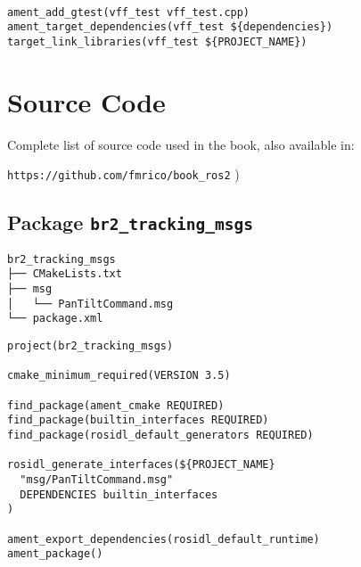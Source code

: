  \footnotesize
\begin{tcolorbox}[sharp corners, colframe=gray!80, colback=LightGray, left=0pt, top=0pt, bottom=0pt, title=\texttt{br2\_vff\_avoidance/tests/CMakeLists.txt}]
  \begin{verbatim}

ament_add_gtest(vff_test vff_test.cpp)
ament_target_dependencies(vff_test ${dependencies})
target_link_libraries(vff_test ${PROJECT_NAME})
    \end{verbatim}
    \end{tcolorbox}
  \normalsize



\appendix

\chapter[Source Code]{Source Code}
\label{cap:source}
Complete list of source code used in the book, also available in:

\vspace{0.5cm}
\large
\texttt{https://github.com/fmrico/book\_ros2}
\normalsize
)
\section{Package \texttt{br2\_tracking\_msgs}}
\label{sec:anex:br2_tracking_msgs}

 \footnotesize
\begin{tcolorbox}[sharp corners, colframe=gray!80, colback=LightGray, left=0pt, top=0pt, bottom=0pt, title=Package \texttt{br2\_tracking\_msgs}]
  \begin{verbatim}
br2_tracking_msgs
├── CMakeLists.txt
├── msg
│   └── PanTiltCommand.msg
└── package.xml    \end{verbatim}
    \end{tcolorbox}
  \normalsize

 \footnotesize
\begin{tcolorbox}[sharp corners, colframe=gray!80, colback=LightGray, left=0pt, top=0pt, bottom=0pt, title=\texttt{br2\_tracking\_msgs/CMakeLists.txt}]
  \begin{verbatim}
project(br2_tracking_msgs)

cmake_minimum_required(VERSION 3.5)

find_package(ament_cmake REQUIRED)
find_package(builtin_interfaces REQUIRED)
find_package(rosidl_default_generators REQUIRED)

rosidl_generate_interfaces(${PROJECT_NAME}
  "msg/PanTiltCommand.msg"
  DEPENDENCIES builtin_interfaces
)

ament_export_dependencies(rosidl_default_runtime)
ament_package()
    \end{verbatim}
    \end{tcolorbox}
  \normalsize

